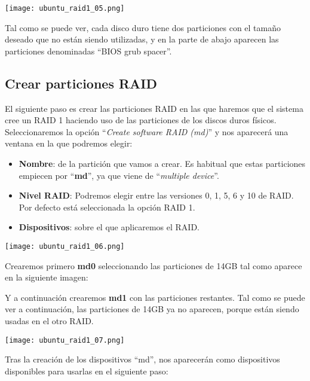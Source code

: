 \begin{center}
    \texttt{[image: ubuntu\_raid1\_05.png]}
\end{center}

Tal como se puede ver, cada disco duro tiene dos particiones con el tamaño deseado que no están siendo utilizadas, y en la parte de abajo aparecen las particiones denominadas “BIOS grub spacer”.


\subsection{Crear particiones RAID}
El siguiente paso es crear las particiones RAID en las que haremos que el sistema cree un RAID 1 haciendo uso de las particiones de los discos duros físicos. Seleccionaremos la opción “\textit{Create software RAID (md)}” y nos aparecerá una ventana en la que podremos elegir:

{
    \begin{minipage}{9cm}
        \begin{itemize}
            \item \textbf{Nombre}: de la partición que vamos a crear. Es habitual que estas particiones empiecen por “\textbf{md}”, ya que viene de “\textit{multiple device}”.
            \item \textbf{Nivel RAID}: Podremos elegir entre las versiones 0, 1, 5, 6 y 10 de RAID. Por defecto está seleccionada la opción RAID 1.
            \item  \textbf{Dispositivos}: sobre el que aplicaremos el RAID.
        \end{itemize}
    \end{minipage}
    \hfill
    \begin{minipage}{7cm}
        \texttt{[image: ubuntu\_raid1\_06.png]}
    \end{minipage}
}


Crearemos primero \textbf{md0} seleccionando las particiones de 14GB tal como aparece en la siguiente imagen:

Y a continuación crearemos \textbf{md1} con las particiones restantes. Tal como se puede ver a continuación, las particiones de 14GB ya no aparecen, porque están siendo usadas en el otro RAID.

\begin{center}
    \texttt{[image: ubuntu\_raid1\_07.png]}
\end{center}


Tras la creación de los dispositivos “md”, nos aparecerán como dispositivos disponibles para usarlas en el siguiente paso:

